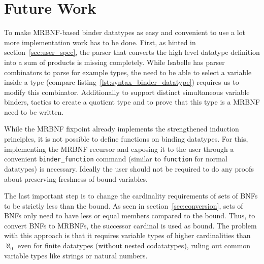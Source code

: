 \chapter{Future Work}

To make \ac{MRBNF}-based binder datatypes as easy and convenient to use a lot more implementation work has to be done. First, as hinted in section~\ref{sec:user_spec}, the parser that converts the high level datatype definition into a sum of products is missing completely. While Isabelle has parser combinators to parse for example types, the need to be able to select a variable inside a type (compare listing~\ref{lst:syntax_binder_datatype}) requires us to modify this combinator. Additionally to support distinct simultaneous variable binders, tactics to create a quotient type and to prove that this type is a \ac{MRBNF} need to be written.

While the \ac{MRBNF} fixpoint already implements the strengthened induction principles, it is not possible to define functions on binding datatypes. For this, implementing the \ac{MRBNF} recursor and exposing it to the user through a convenient \texttt{binder\_function} command (similar to \texttt{function} for normal datatypes) is necessary. Ideally the user should not be required to do any proofs about preserving freshness of bound variables.

The last important step is to change the cardinality requirements of sets of \acp{BNF} to be strictly less than the bound. As seen in section~\ref{sec:conversion}, sets of \acp{BNF} only need to have less or equal members compared to the bound. Thus, to convert \acp{BNF} to \acp{MRBNF}, the successor cardinal is used as bound. The problem with this approach is that it requires variable types of higher cardinalities than $\aleph_0$ even for finite datatypes (without nested codatatypes), ruling out common variable types like strings or natural numbers.
